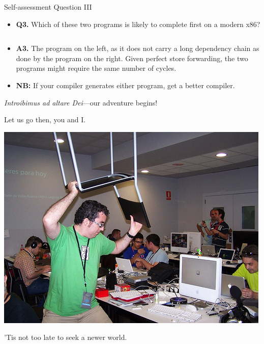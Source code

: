 \documentclass{beamer}
\newcommand{\code}[2]{
  \tiny{{}}
}
\begin{document}
\begin{frame}{Self-assessment Question III}
\begin{itemize}
\item \textbf{Q3.} Which of these two programs is likely to complete first
	on a modern x86?\\
\begin{columns}
\begin{column}{.5\textwidth}
\code{A}{code/introq3a.S}
\end{column}
\begin{column}{.5\textwidth}
\code{B}{code/introq3b.S}
\end{column}
\end{columns}
\item \textbf{A3.} The program on the left, as it does not carry a long
	dependency chain as done by the program on the right. Given perfect
	store forwarding, the two programs might require the same number of
	cycles.
\item \textbf{NB:} If your compiler generates either program, get a better compiler.
\end{itemize}
\end{frame}

\begin{frame}{\textit{Introibimus ad altare Dei}---our adventure begins!}
\begin{center}
Let us go then, you and I.

\vspace{.25in}
\includegraphics[scale=0.33]{images/angry.jpg}
\vspace{.25in}

'Tis not too late to seek a newer world.
\end{center}
\end{frame}

\begin{frame}
\end{frame}
\end{document}
